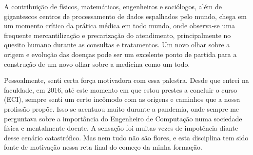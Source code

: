 \documentclass{homework}
\begin{document}
	\par
	A contribuição de físicos, matemáticos, engenheiros e sociólogos, além de gigantescos centros de processamento de dados espalhados pelo mundo, chega em um momento crítico da prática médica em todo mundo, onde observa-se uma frequente mercantilização e precarização do atendimento, principalmente no quesito humano durante as consultas e tratamentos. Um novo olhar sobre a origem e evolução das doenças pode ser um excelente ponto de partida para a construção de um novo olhar sobre a medicina como um todo.%
	\par
	Pessoalmente, senti certa força motivadora com essa palestra. Desde que entrei na faculdade, em 2016, até este momento em que estou prestes a concluir o curso (ECI), sempre senti um certo incômodo com as origens e caminhos que a nossa profissão propõe. Isso se acentuou muito durante a pandemia, onde sempre me perguntava sobre a importância do Engenheiro de Computação numa sociedade física e mentalmente doente. A sensação foi muitas vezes de impotência diante desse cenário catastrófico. Mas nem tudo não são flores, e esta disciplina tem sido fonte de motivação nessa reta final do começo da minha formação.
\end{document}
